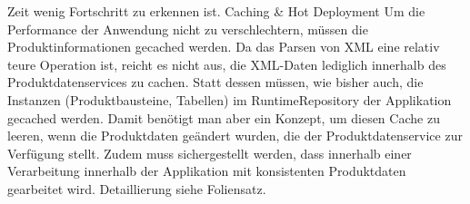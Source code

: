 \documentclass[headsepline=true, footsepline=true]{scrartcl}
\begin{document}
Zeit wenig Fortschritt zu erkennen ist. Caching \& Hot Deployment Um die
Performance der Anwendung nicht zu verschlechtern, müssen die
Produktinformationen gecached werden. Da das Parsen von XML eine relativ teure
Operation ist, reicht es nicht aus, die XML-Daten lediglich innerhalb des
Produktdatenservices zu cachen. Statt dessen müssen, wie bisher auch, die
Instanzen (Produktbausteine, Tabellen) im RuntimeRepository der Applikation
gecached werden. Damit benötigt man aber ein Konzept, um diesen Cache zu leeren,
wenn die Produktdaten geändert wurden, die der Produktdatenservice zur Verfügung
stellt. Zudem muss sichergestellt werden, dass innerhalb einer Verarbeitung
innerhalb der Applikation mit konsistenten Produktdaten gearbeitet wird.
Detaillierung siehe Foliensatz.
\end{document}
